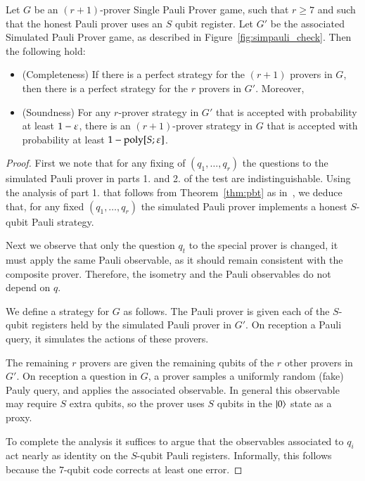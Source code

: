\begin{theorem}
Let $G$ be an $(r+1)$-prover Single Pauli Prover game, such that $r\geq 7$ and such that the honest Pauli prover uses an $S$ qubit register. Let $G'$ be the associated Simulated Pauli Prover game, as described in Figure~\ref{fig:simpauli_check}. Then the following hold:
\begin{itemize}
\item (Completeness) If there is a perfect strategy for the $(r+1)$ provers in $G$, then there is a perfect strategy for the $r$ provers in $G'$. Moreover, 
\item (Soundness) For any $r$-prover strategy in $G'$ that is accepted with probability at least $1-\varepsilon$, there is an $(r+1)$-prover strategy in $G$ that is accepted with probability at least $1-\operatorname{poly}[S;\varepsilon]$.
\end{itemize}
\end{theorem}

\begin{proof}
First we note that for any fixing of $(q_1,\ldots,q_r)$ the questions to the simulated Pauli prover in parts 1. and 2. of the test are indistinguishable. Using the analysis of part 1. that follows from Theorem~\ref{thm:pbt} as in~\cite{}, we deduce that, for any fixed $(q_1,\ldots,q_r)$ the simulated Pauli prover implements a honest $S$-qubit Pauli strategy. 

Next we observe that only the question $q_t$ to the special prover is changed, it must apply the same Pauli observable, as it should remain consistent with the composite prover. Therefore, the isometry and the Pauli observables do not depend on $q$. 

We define a strategy for $G$ as follows. The Pauli prover is given each of the $S$-qubit registers held by the simulated Pauli prover in $G'$. On reception a Pauli query, it simulates the actions of these provers. 

The remaining $r$ provers are given the remaining qubits of the $r$ other provers in $G'$. On reception a question in $G$, a prover samples a uniformly random (fake) Pauly query, and applies the associated observable. In general this observable may require $S$ extra qubits, so the prover uses $S$ qubits in the $|0\rangle$ state as a proxy. 

To complete the analysis it suffices to argue that the observables associated to $q_i$ act nearly as identity on the $S$-qubit Pauli registers. Informally, this follows because the $7$-qubit code corrects at least one error.
\end{proof}